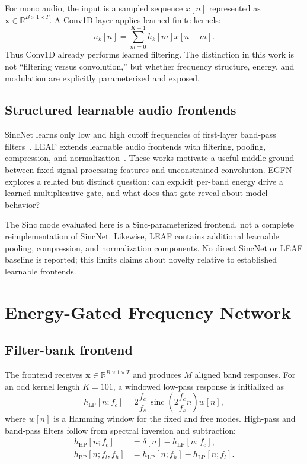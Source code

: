 \documentclass[10pt,twocolumn]{article}
\newcommand{\egfn}{EGFN}
\newcommand{\vect}[1]{\boldsymbol{#1}}
\begin{document}
For mono audio, the input is a sampled sequence
$x[n]$ represented as $\vect{x}\in\mathbb{R}^{B\times1\times T}$. A Conv1D
layer applies learned finite kernels:
\begin{equation}
  u_k[n]=\sum_{m=0}^{K-1}h_k[m]x[n-m].
  \label{eq:conv}
\end{equation}
Thus Conv1D already performs learned filtering. The distinction in this work is
not ``filtering versus convolution,'' but whether frequency structure, energy,
and modulation are explicitly parameterized and exposed.

\subsection{Structured learnable audio frontends}

SincNet learns only low and high cutoff frequencies of first-layer band-pass
filters~\cite{ravanelli2018sincnet}. LEAF extends learnable audio frontends with
filtering, pooling, compression, and normalization~\cite{zeghidour2021leaf}.
These works motivate a useful middle ground between fixed signal-processing
features and unconstrained convolution. \egfn{} explores a related but distinct
question: can explicit per-band energy drive a learned multiplicative gate, and
what does that gate reveal about model behavior?

The Sinc mode evaluated here is a Sinc-parameterized frontend, not a complete
reimplementation of SincNet. Likewise, LEAF contains additional learnable
pooling, compression, and normalization components. No direct SincNet or LEAF
baseline is reported; this limits claims about novelty relative to established
learnable frontends.

\section{Energy-Gated Frequency Network}

\subsection{Filter-bank frontend}

The frontend receives $\vect{x}\in\mathbb{R}^{B\times1\times T}$ and produces
$M$ aligned band responses. For an odd kernel length $K=101$, a windowed
low-pass response is initialized as
\begin{equation}
  h_{\mathrm{LP}}[n;f_c]
  =2\frac{f_c}{f_s}\,
   \operatorname{sinc}\!\left(2\frac{f_c}{f_s}n\right)w[n],
  \label{eq:lowpass}
\end{equation}
where $w[n]$ is a Hamming window for the fixed and free modes. High-pass and
band-pass filters follow from spectral inversion and subtraction:
\begin{align}
  h_{\mathrm{HP}}[n;f_c] &= \delta[n]-h_{\mathrm{LP}}[n;f_c],\\
  h_{\mathrm{BP}}[n;f_l,f_h] &= h_{\mathrm{LP}}[n;f_h]-h_{\mathrm{LP}}[n;f_l].
\end{align}
\end{document}
